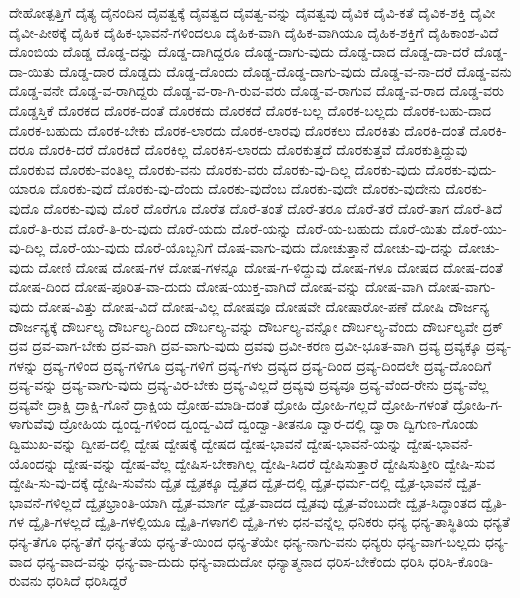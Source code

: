 {ದೇಹೋತ್ಪತ್ತಿಗೆ
ದೈತ್ಯ
ದೈನಂದಿನ
ದೈವತ್ವಕ್ಕೆ
ದೈವತ್ವದ
ದೈವತ್ವ-ವನ್ನು
ದೈವತ್ವವು
ದೈವಿಕ
ದೈವಿ-ಕತೆ
ದೈವಿಕ-ಶಕ್ತಿ
ದೈವೀ
ದೈವೀ-ಪೀಠಕ್ಕೆ
ದೈಹಿಕ
ದೈಹಿಕ-ಭಾವನೆ-ಗಳಿಂದಲೂ
ದೈಹಿಕ-ವಾಗಿ
ದೈಹಿಕ-ವಾಗಿಯೂ
ದೈಹಿಕ-ಶಕ್ತಿಗೆ
ದೈಹಿಕಾಂಶ-ವಿದೆ
ದೊಂಬಿಯ
ದೊಡ್ಡ
ದೊಡ್ಡ-ದನ್ನು
ದೊಡ್ಡ-ದಾಗಿದ್ದರೂ
ದೊಡ್ಡ-ದಾಗು-ವುದು
ದೊಡ್ಡ-ದಾದ
ದೊಡ್ಡ-ದಾ-ದರೆ
ದೊಡ್ಡ-ದಾ-ಯಿತು
ದೊಡ್ಡ-ದಾರ
ದೊಡ್ಡದು
ದೊಡ್ಡ-ದೊಂದು
ದೊಡ್ಡ-ದೊಡ್ಡ-ದಾಗು-ವುದು
ದೊಡ್ಡ-ವ-ನಾ-ದರೆ
ದೊಡ್ಡ-ವನು
ದೊಡ್ಡ-ವನೇ
ದೊಡ್ಡ-ವ-ರಾಗಿದ್ದರು
ದೊಡ್ಡ-ವ-ರಾ-ಗಿ-ರುವ-ವರು
ದೊಡ್ಡ-ವ-ರಾಗುವ
ದೊಡ್ಡ-ವ-ರಾದ
ದೊಡ್ಡ-ವರು
ದೊಡ್ಡಸ್ತಿಕೆ
ದೊರಕದ
ದೊರಕ-ದಂತೆ
ದೊರಕದು
ದೊರಕದೆ
ದೊರಕ-ಬಲ್ಲ
ದೊರಕ-ಬಲ್ಲದು
ದೊರಕ-ಬಹು-ದಾದ
ದೊರಕ-ಬಹುದು
ದೊರಕ-ಬೇಕು
ದೊರಕ-ಲಾರದು
ದೊರಕ-ಲಾರವು
ದೊರಕಲು
ದೊರಕಿತು
ದೊರಕಿ-ದಂತೆ
ದೊರಕಿ-ದರೂ
ದೊರಕಿ-ದರೆ
ದೊರಕಿದೆ
ದೊರಕಿಲ್ಲ
ದೊರಕಿಸ-ಲಾರದು
ದೊರಕುತ್ತದೆ
ದೊರಕುತ್ತವೆ
ದೊರಕುತ್ತಿದ್ದುವು
ದೊರಕುವ
ದೊರಕು-ವಂತಿಲ್ಲ
ದೊರಕು-ವನು
ದೊರಕು-ವರು
ದೊರಕು-ವು-ದಿಲ್ಲ
ದೊರಕು-ವುದು
ದೊರಕು-ವುದು-ಯಾರೂ
ದೊರಕು-ವುದೆ
ದೊರಕು-ವು-ದೆಂದು
ದೊರಕು-ವುದೆಂಬ
ದೊರಕು-ವುದೇ
ದೊರಕು-ವುದೇನು
ದೊರಕು-ವುದೊ
ದೊರಕು-ವುವು
ದೊರೆ
ದೊರೆಗೂ
ದೊರೆತ
ದೊರೆ-ತಂತೆ
ದೊರೆ-ತರೂ
ದೊರೆ-ತರೆ
ದೊರೆ-ತಾಗ
ದೊರೆ-ತಿದೆ
ದೊರೆ-ತಿ-ರುವ
ದೊರೆ-ತಿ-ರು-ವುದು
ದೊರೆ-ಯದು
ದೊರೆ-ಯನ್ನು
ದೊರೆ-ಯ-ಬಹುದು
ದೊರೆ-ಯಿತು
ದೊರೆ-ಯು-ವು-ದಿಲ್ಲ
ದೊರೆ-ಯು-ವುದು
ದೊರೆ-ಯೊಬ್ಬನಿಗೆ
ದೊಷ-ವಾಗು-ವುದು
ದೋಚುತ್ತಾನೆ
ದೋಚು-ವು-ದನ್ನು
ದೋಚು-ವುದು
ದೋಣಿ
ದೋಷ
ದೋಷ-ಗಳ
ದೋಷ-ಗಳನ್ನೂ
ದೋಷ-ಗ-ಳಿದ್ದುವು
ದೋಷ-ಗಳೂ
ದೋಷದ
ದೋಷ-ದಂತೆ
ದೋಷ-ದಿಂದ
ದೋಷ-ಪೂರಿತ-ವಾ-ದುದು
ದೋಷ-ಯುಕ್ತ-ವಾಗಿದೆ
ದೋಷ-ವನ್ನು
ದೋಷ-ವಾಗಿ
ದೋಷ-ವಾಗು-ವುದು
ದೋಷ-ವಿತ್ತು
ದೋಷ-ವಿದೆ
ದೋಷ-ವಿಲ್ಲ
ದೋಷವೂ
ದೋಷವೇ
ದೋಷಾರೋ-ಪಣೆ
ದೋಷಿ
ದೌರ್ಜನ್ಯ
ದೌರ್ಜನ್ಯಕ್ಕೆ
ದೌರ್ಬಲ್ಯ
ದೌರ್ಬಲ್ಯ-ದಿಂದ
ದೌರ್ಬಲ್ಯ-ವನ್ನು
ದೌರ್ಬಲ್ಯ-ವನ್ನೋ
ದೌರ್ಬಲ್ಯ-ವೆಂದು
ದೌರ್ಬಲ್ಯವೇ
ದ್ರಕ್
ದ್ರವ
ದ್ರವ-ವಾಗ-ಬೇಕು
ದ್ರವ-ವಾಗಿ
ದ್ರವ-ವಾಗು-ವುದು
ದ್ರವವು
ದ್ರವೀ-ಕರಣ
ದ್ರವೀ-ಭೂತ-ವಾಗಿ
ದ್ರವ್ಯ
ದ್ರವ್ಯಕ್ಕೂ
ದ್ರವ್ಯ-ಗಳನ್ನು
ದ್ರವ್ಯ-ಗಳಿಂದ
ದ್ರವ್ಯ-ಗಳಿಗೂ
ದ್ರವ್ಯ-ಗಳಿಗೆ
ದ್ರವ್ಯ-ಗಳು
ದ್ರವ್ಯದ
ದ್ರವ್ಯ-ದಿಂದ
ದ್ರವ್ಯ-ದಿಂದಲೇ
ದ್ರವ್ಯ-ದೊಂದಿಗೆ
ದ್ರವ್ಯ-ವನ್ನು
ದ್ರವ್ಯ-ವಾಗು-ವುದು
ದ್ರವ್ಯ-ವಿರ-ಬೇಕು
ದ್ರವ್ಯ-ವಿಲ್ಲದೆ
ದ್ರವ್ಯವು
ದ್ರವ್ಯವೂ
ದ್ರವ್ಯ-ವೆಂದ-ರೇನು
ದ್ರವ್ಯ-ವೆಲ್ಲ
ದ್ರವ್ಯವೇ
ದ್ರಾಕ್ಷಿ
ದ್ರಾಕ್ಷಿ-ಗೊನೆ
ದ್ರಾಕ್ಷಿಯ
ದ್ರೋಹ-ಮಾಡಿ-ದಂತೆ
ದ್ರೋಹಿ
ದ್ರೋಹಿ-ಗಲ್ಲದೆ
ದ್ರೋಹಿ-ಗಳಂತೆ
ದ್ರೋಹಿ-ಗ-ಳಾಗುವೆವು
ದ್ರೋಹಿಯ
ದ್ವಂದ್ವ-ಗಳಿಂದ
ದ್ವಂದ್ವ-ವಿದೆ
ದ್ವಂದ್ವಾ-ತೀತನೂ
ದ್ವಾರ-ದಲ್ಲಿ
ದ್ವಾರಾ
ದ್ವಿಗುಣ-ಗೊಂಡು
ದ್ವಿಮುಖ-ವನ್ನು
ದ್ವೀಪ-ದಲ್ಲಿ
ದ್ವೇಷ
ದ್ವೇಷಕ್ಕೆ
ದ್ವೇಷದ
ದ್ವೇಷ-ಭಾವನೆ
ದ್ವೇಷ-ಭಾವನೆ-ಯನ್ನು
ದ್ವೇಷ-ಭಾವನೆ-ಯೊಂದನ್ನು
ದ್ವೇಷ-ವನ್ನು
ದ್ವೇಷ-ವೆಲ್ಲ
ದ್ವೇಷಿಸ-ಬೇಕಾಗಿಲ್ಲ
ದ್ವೇಷಿ-ಸಿದರೆ
ದ್ವೇಷಿಸುತ್ತಾರೆ
ದ್ವೇಷಿಸುತ್ತೀರಿ
ದ್ವೇಷಿ-ಸುವ
ದ್ವೇಷಿ-ಸು-ವು-ದಕ್ಕೆ
ದ್ವೇಷಿ-ಸುವೆನು
ದ್ವೈತ
ದ್ವೈತಕ್ಕೂ
ದ್ವೈತದ
ದ್ವೈತ-ದಲ್ಲಿ
ದ್ವೈತ-ಧರ್ಮ-ದಲ್ಲಿ
ದ್ವೈತ-ಭಾವನೆ
ದ್ವೈತ-ಭಾವನೆ-ಗಳಿಲ್ಲದೆ
ದ್ವೈತಭ್ರಾಂತಿ-ಯಾಗಿ
ದ್ವೈತ-ಮಾರ್ಗ
ದ್ವೈತ-ವಾದದ
ದ್ವೈತವು
ದ್ವೈತ-ವೆಂಬುದೇ
ದ್ವೈತ-ಸಿದ್ಧಾಂತದ
ದ್ವೈತಿ-ಗಳ
ದ್ವೈತಿ-ಗಳಲ್ಲದೆ
ದ್ವೈತಿ-ಗಳಲ್ಲಿಯೂ
ದ್ವೈತಿ-ಗಳಾಗಲಿ
ದ್ವೈತಿ-ಗಳು
ಧನ-ವನ್ನೆಲ್ಲ
ಧನಿಕರು
ಧನ್ಯ
ಧನ್ಯ-ತಾಸ್ಥಿತಿಯ
ಧನ್ಯತೆ
ಧನ್ಯ-ತೆಗೂ
ಧನ್ಯ-ತೆಗೆ
ಧನ್ಯ-ತೆಯ
ಧನ್ಯ-ತೆ-ಯಿಂದ
ಧನ್ಯ-ತೆಯೇ
ಧನ್ಯ-ನಾಗು-ವನು
ಧನ್ಯರು
ಧನ್ಯ-ವಾಗ-ಬಲ್ಲದು
ಧನ್ಯ-ವಾದ
ಧನ್ಯ-ವಾದ-ವನ್ನು
ಧನ್ಯ-ವಾ-ದುದು
ಧನ್ಯ-ವಾದುದೋ
ಧನ್ಯಾತ್ಮನಾದ
ಧರಿಸ-ಬೇಕೆಂದು
ಧರಿಸಿ
ಧರಿಸಿ-ಕೊಂಡಿ-ರುವನು
ಧರಿಸಿದೆ
ಧರಿಸಿದ್ದರೆ
}
